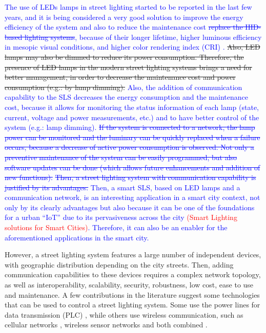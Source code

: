 \documentclass[authoryear,preprint,review,12pt]{elsarticle}
\newcommand{\rev}{\textcolor{blue}}
\newcommand{\refs}{\textcolor{red}}
\begin{document}
\rev{The use of LEDs lamps in street lighting started to be reported in the last few years, and it is being considered a very good solution to improve the energy efficiency of the system and also to reduce the maintenance cost \sout{replace the HID-based lighting systems}, because of their longer lifetime, higher luminous efficiency in mesopic visual conditions, and higher color rendering index (CRI) \citep{CRI_2008,CRI_2010}.} \sout{Also, LED lamps may also be dimmed to reduce its power consumption.
Therefore, the presence of LED lamps in the modern street lighting systems brings a need for better management, in order to decrease the maintenance cost and power consumption (e.g.: by lamp dimming).} \rev{Also, the addition of communication capability to the SLS decreases the energy consumption and the maintenance cost, because it allows for monitoring the status information of each lamp (state, current, voltage and power measurements, etc.) and to have better control of the system (e.g.: lamp dimming). \sout{If the system is connected to a network, the lamp power can be monitored and the luminary can be quickly replaced when a failure occurs, because a decrease of active power consumption is observed. Not only a preventive maintenance of the system can be easily programmed, but also software updates can be done (which allows future enhancements and addition of new functions).}  \sout{Then, a street lighting system with communication capability is justified by its advantages.} Then, a smart SLS, based on LED lamps and a communication network, is an interesting application in a smart city context, not only by its clearly advantages but also because it can be one of the foundations for a urban ``IoT'' due to its pervasiveness across the city \refs{(Smart Lighting solutions for Smart Cities)}. Therefore, it can also be an enabler for the aforementioned applications in the smart city.}

However, a street lighting system features a large number of independent devices, with geographic distribution depending on the city streets. Then, adding communication capabilities to these devices requires a complex network topology, as well as interoperability, scalability, security, robustness, low cost, ease to use and maintenance. A few contributions in the literature suggest some technologies that can be used to control a street lighting system. Some use the power lines for data transmission (PLC) \citep{PLC_Street_Lighting_2003,PLC_Street_Lighting_2006}, while others use wireless communication, such as cellular networks \citep{Cellular_Street_Lighting_2009_1,Cellular_Street_Lighting_2010_1}, wireless sensor networks \citep{WSN_Street_Lighting_2010_1, WSN_Street_Lighting_2010_2} and both combined \citep{WSN_Street_lighting_2006, WSN_Street_lighting_2007}.
\end{document}

